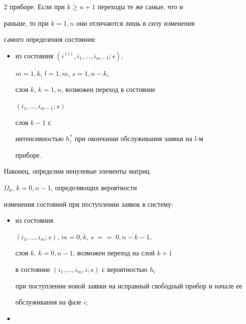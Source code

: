 \begin{multicols}{2}
приборе. Если при $k\ge n+1$ переходы те же самые, что и


раньше, то при $k=\overline{1,n}$ они отличаются лишь в силу изменения


самого определения состояния:


\begin{itemize}


\item из состояния $(i^{(l)},i_1,\ldots,i_{m-1};s)$,


$m=\overline{1,k}$, $l=\overline{1,m}$, $s=\overline{1,n-k}$,


слоя $k$, $k=\overline{1,n}$, возможен переход в состояние


$(i_1,\ldots,i_{m-1};s)$                 %


слоя $k-1$ с


интенсивностью $h_i^*$ при окончании обслуживания заявки на $l$-м


приборе.


\end{itemize}





Наконец, определим ненулевые элементы мат\-риц


$\Omega_k$, $k=\overline{0,n-1}$, определяющих вероятности


изменения состояний при поступлении заявок в систему:


\begin{itemize}


\item из состояния


$(i_1,\ldots,i_m;s)$, $m=\overline{0,k}$, $s\;=$\linebreak $=\;\overline{0,n-k-1}$,


слоя $k$, $k=\overline{0,n-1}$, возможен переход на слой $k+1$


в состояние $(i_1,\ldots,i_m,i;s)$ с вероятностью $h_{i}$


при поступлении новой заявки на исправный свободный прибор и начале ее


обслуживания на фазе $i$;


\item









\end{itemize}
\end{multicols}
